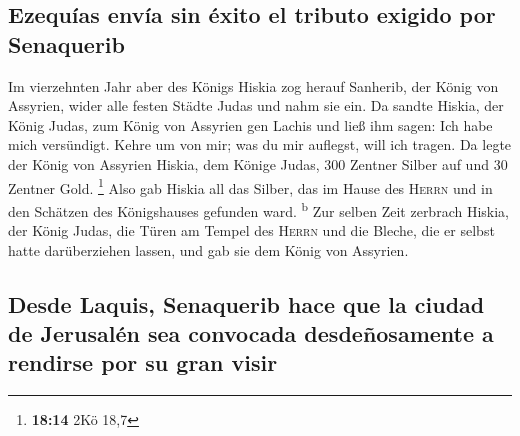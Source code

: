 \hypertarget{ezequuxedas-envuxeda-sin-uxe9xito-el-tributo-exigido-por-senaquerib}{%
\subsection{Ezequías envía sin éxito el tributo exigido por
Senaquerib}\label{ezequuxedas-envuxeda-sin-uxe9xito-el-tributo-exigido-por-senaquerib}}

 Im vierzehnten Jahr aber des Königs Hiskia zog herauf
Sanherib, der König von Assyrien, wider alle festen Städte Judas und
nahm sie ein.  Da sandte Hiskia, der König Judas, zum
König von Assyrien gen Lachis und ließ ihm sagen: Ich habe mich
versündigt. Kehre um von mir; was du mir auflegst, will ich tragen. Da
legte der König von Assyrien Hiskia, dem Könige Judas, 300 Zentner
Silber auf und 30 Zentner Gold. \footnote{\textbf{18:14} 2Kö 18,7}
 Also gab Hiskia all das Silber, das im Hause des
\textsc{Herrn} und in den Schätzen des Königshauses gefunden ward.
\textsuperscript{b}  Zur selben Zeit zerbrach Hiskia, der
König Judas, die Türen am Tempel des \textsc{Herrn} und die Bleche, die
er selbst hatte darüberziehen lassen, und gab sie dem König von
Assyrien.

\hypertarget{desde-laquis-senaquerib-hace-que-la-ciudad-de-jerusaluxe9n-sea-convocada-desdeuxf1osamente-a-rendirse-por-su-gran-visir}{%
\subsection{Desde Laquis, Senaquerib hace que la ciudad de Jerusalén sea
convocada desdeñosamente a rendirse por su gran
visir}\label{desde-laquis-senaquerib-hace-que-la-ciudad-de-jerusaluxe9n-sea-convocada-desdeuxf1osamente-a-rendirse-por-su-gran-visir}}


